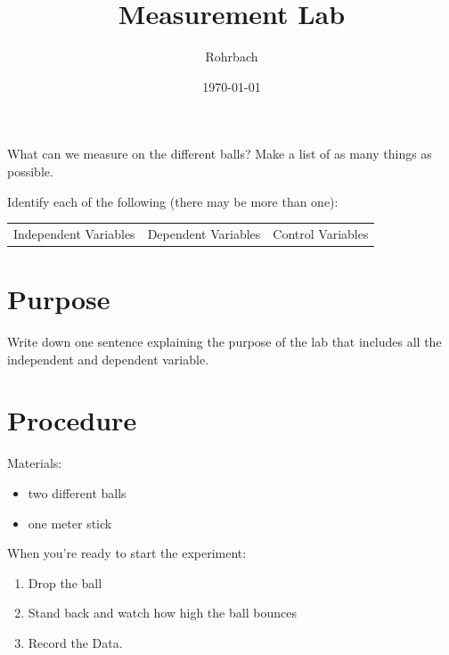 \documentclass[10pt]{exam}
\title{Measurement Lab}
\author{Rohrbach}
\date{\today}
\begin{document}
\maketitle

\vspace{-2em}
\begin{questions}
  
    \question
      What can we measure on the different balls?  Make 
      a list of as many things as possible. 
      \vs[3]

    \question
      Identify each of the following (there may be more 
      than one):
      
      \begin{center}
        \begin{tabular}
          { m{} | m{}| m{} } 
          Independent Variables & 
          Dependent Variables   & 
          Control Variables  \\[8em]
        \end{tabular}
      \end{center}
    
  
\end{questions}

\section*{Purpose}
Write down one sentence explaining the purpose of the lab that includes all the independent and dependent variable.
\vs[2]

\section*{Procedure}

Materials:

\begin{itemize}[topsep=0pt,itemsep=-1ex,partopsep=1ex,parsep=1ex]
  \item two different balls
  \item one meter stick
\end{itemize}


\noindent When you're ready to start the experiment:

\begin{enumerate}[topsep=0pt,itemsep=-1ex,partopsep=1ex,parsep=1ex]
  \item Drop the ball
  \item Stand back and watch how high the ball bounces
  \item Record the Data.
\end{enumerate}
\end{document}
